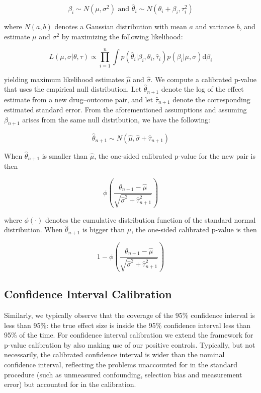 \documentclass[11pt]{book}
\theoremstyle{definition}
\theoremstyle{definition}
\theoremstyle{definition}
\theoremstyle{remark}
\begin{document}
\[\beta_i \sim N(\mu,\sigma^2) \text{  and  } \hat{\theta}_i \sim N(\theta_i + \beta_i, \tau_i^2)\]

where \(N(a,b)\) denotes a Gaussian distribution with mean \(a\) and
variance \(b\), and estimate \(\mu\) and \(\sigma^2\) by maximizing the
following likelihood:

\[L(\mu, \sigma | \theta, \tau) \propto \prod_{i=1}^{n}\int p(\hat{\theta}_i|\beta_i, \theta_i, \hat{\tau}_i)p(\beta_i|\mu, \sigma) \text{d}\beta_i\]

yielding maximum likelihood estimates \(\hat{\mu}\) and
\(\hat{\sigma}\). We compute a calibrated p-value that uses the
empirical null distribution. Let \(\hat{\theta}_{n+1}\) denote the log
of the effect estimate from a new drug--outcome pair, and let
\(\hat{\tau}_{n+1}\) denote the corresponding estimated standard error.
From the aforementioned assumptions and assuming \(\beta_{n+1}\) arises
from the same null distribution, we have the following:

\[\hat{\theta}_{n+1} \sim N(\hat{\mu}, \hat{\sigma} + \hat{\tau}_{n+1})\]

When \(\hat{\theta}_{n+1}\) is smaller than \(\hat{\mu}\), the one-sided
calibrated p-value for the new pair is then

\[\phi\left(\frac{\theta_{n+1} - \hat{\mu}}{\sqrt{\hat{\sigma}^2 + \hat{\tau}_{n+1}^2}}\right)\]

where \(\phi(\cdot)\) denotes the cumulative distribution function of
the standard normal distribution. When \(\hat{\theta}_{n+1}\) is bigger
than \(\hat{\mu}\), the one-sided calibrated p-value is then

\[1-\phi\left(\frac{\theta_{n+1} - \hat{\mu}}{\sqrt{\hat{\sigma}^2 + \hat{\tau}_{n+1}^2}}\right)\]

\subsection{Confidence Interval
Calibration}\label{confidence-interval-calibration}


Similarly, we typically observe that the coverage of the 95\% confidence
interval is less than 95\%: the true effect size is inside the 95\%
confidence interval less than 95\% of the time. For confidence interval
calibration \citep{schuemie_2018} we extend the framework for p-value
calibration by also making use of our positive controls. Typically, but
not necessarily, the calibrated confidence interval is wider than the
nominal confidence interval, reflecting the problems unaccounted for in
the standard procedure (such as unmeasured confounding, selection bias
and measurement error) but accounted for in the calibration.
\end{document}
